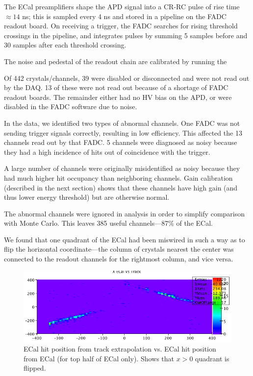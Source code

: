 
\vspace{1cm}{\bf ECal performance [Sho]}

The ECal preamplifiers shape the APD signal into a CR-RC pulse of rise time $\approx 14$ ns; this is sampled every 4 ns and stored in a pipeline on the FADC readout board.
On receiving a trigger, the FADC searches for rising threshold crossings in the pipeline, and integrates pulses by summing 5 samples before and 30 samples after each threshold crossing.

The noise and pedestal of the readout chain are calibrated by running the

Of 442 crystals/channels, 39 were disabled or disconnected and were not read out by the DAQ. 
13 of these were not read out because of a shortage of FADC readout boards.
The remainder either had no HV bias on the APD, or were disabled in the FADC software due to noise.

In the data, we identified two types of abnormal channels. 
One FADC was not sending trigger signals correctly, resulting in low efficiency. This affected the 13 channels read out by that FADC.
5 channels were diagnosed as noisy because they had a high incidence of hits out of coincidence with the trigger.

A large number of channels were originally misidentified as noisy because they had much higher hit occupancy than neighboring channels.
Gain calibration (described in the next section) shows that these channels have high gain (and thus lower energy threshold) but are otherwise normal.

The abnormal channels were ignored in analysis in order to simplify comparison with Monte Carlo. This leaves 385 useful channels---87\% of the ECal.

We found that one quadrant of the ECal had been miswired in such a way as to flip the horizontal coordinate---the column of crystals nearest the center was connected to the readout channels for the rightmost column, and vice versa.

\begin{figure}[ht]
	\includegraphics[width=\textwidth]{test2012/ecalperformance/x_match_flip}
	\caption{\small{ECal hit position from track extrapolation vs. ECal hit position from ECal (for top half of ECal only). Shows that $x>0$ quadrant is flipped.}}
	\label{fig:x_flip}
\end{figure}

